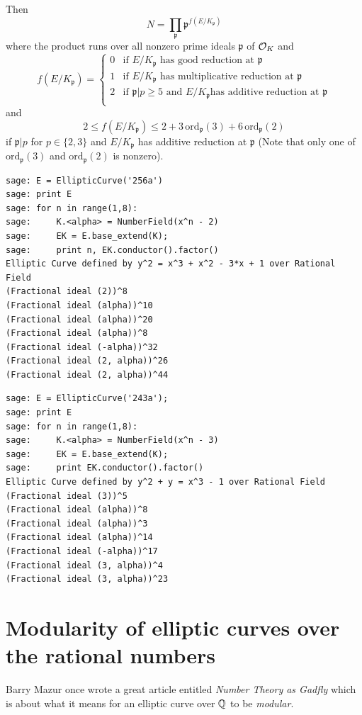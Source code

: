 \documentclass{book}
\begin{document}
Then
$$
N = \prod_{\mathfrak{p}} \mathfrak{p}^{f(E/K_{\mathfrak{p}})}
$$
where the product runs over all nonzero prime ideals $\mathfrak{p}$
of $\mathcal{O}_K$ and
$$
f(E/K_\mathfrak{p}) = \left\{\begin{array}{ll}
0 & \text{if $E/K_{\mathfrak{p}}$ has good reduction at $\mathfrak{p}$} \\
1 & \text{if $E/K_{\mathfrak{p}}$ has multiplicative
reduction at $\mathfrak{p}$} \\
2 & \text{if $\mathfrak{p}|p \geq 5$ and $E/K_{\mathfrak{p}}$
has additive reduction at $\mathfrak{p}$} \\
\end{array}\right.
$$
and
$$
2 \leq f(E/K_{\mathfrak{p}}) \leq 2 + 3 \, \mathrm{ord}_{\mathfrak{p}}(3)
 + 6 \, \mathrm{ord}_{\mathfrak{p}}(2)
$$
if $\mathfrak{p}|p$ for $p \in \{2, 3\}$ and $E/K_{\mathfrak{p}}$ has
additive reduction at $\mathfrak{p}$ (Note that only one of
$\mathrm{ord}_{\mathfrak{p}}(3)$ and $\mathrm{ord}_{\mathfrak{p}}(2)$ is
nonzero).

\begin{lstlisting}
sage: E = EllipticCurve('256a')
sage: print E
sage: for n in range(1,8):
sage:     K.<alpha> = NumberField(x^n - 2)
sage:     EK = E.base_extend(K);
sage:     print n, EK.conductor().factor()
Elliptic Curve defined by y^2 = x^3 + x^2 - 3*x + 1 over Rational Field
(Fractional ideal (2))^8
(Fractional ideal (alpha))^10
(Fractional ideal (alpha))^20
(Fractional ideal (alpha))^8
(Fractional ideal (-alpha))^32
(Fractional ideal (2, alpha))^26
(Fractional ideal (2, alpha))^44
\end{lstlisting}

\begin{lstlisting}
sage: E = EllipticCurve('243a');
sage: print E
sage: for n in range(1,8):
sage:     K.<alpha> = NumberField(x^n - 3)
sage:     EK = E.base_extend(K);
sage:     print EK.conductor().factor()
Elliptic Curve defined by y^2 + y = x^3 - 1 over Rational Field
(Fractional ideal (3))^5
(Fractional ideal (alpha))^8
(Fractional ideal (alpha))^3
(Fractional ideal (alpha))^14
(Fractional ideal (-alpha))^17
(Fractional ideal (3, alpha))^4
(Fractional ideal (3, alpha))^23
\end{lstlisting}

\section{Modularity of elliptic curves over the rational numbers}
Barry Mazur once wrote a great article entitled {\em Number Theory as Gadfly}
which is about what it means for an elliptic curve
over $\mathbb{Q}$ to be {\em modular}.
\end{document}
